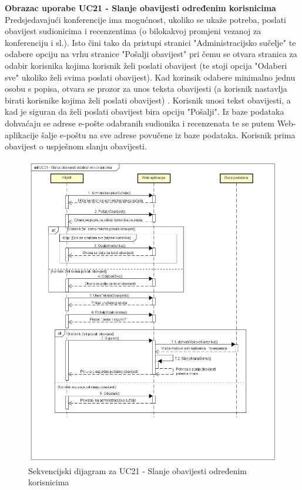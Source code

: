 				\eject


				\textbf{Obrazac uporabe UC21 - Slanje obavijesti određenim korisnicima}\\
				Predsjedavajući konferencije ima mogućnost, ukoliko se ukaže potreba, poslati obavijest sudionicima i recenzentima (o bilokakvoj promjeni vezanoj za konferenciju i sl.). Isto čini tako da pristupi stranici "Administracijsko sučelje" te odabere opciju na vrhu stranice "Pošalji obavijest" pri čemu se otvara stranica za odabir korisnika kojima korisnik želi poslati obavijest (te stoji opcija "Odaberi sve" ukoliko želi svima poslati obavijest). Kad korinsik odabere minimalno jednu osobu s popisa, otvara se prozor za unos teksta obavijesti (a korisnik nastavlja birati korisnike kojima želi poslati obavijest) . Korisnik unosi tekst obavijesti, a kad je siguran da želi poslati obavijest bira opciju "Pošalji". Iz baze podataka dohvaćaju se adrese e-pošte odabranih sudionika i recenzenata te se putem Web-aplikacije šalje e-poštu na sve adrese povučene iz baze podataka. Korisnik prima obavijest o uspješnom slanju obavijesti.
				\eject

				\begin{figure}[H]
					\includegraphics[scale=0.45]{dijagrami/UC21-SlanjeMaila.png} 
					\centering
					\caption{Sekvencijski dijagram za UC21 - Slanje obavijesti određenim korisnicima}
					\label{fig:sekvencijski3}
				\end{figure}

